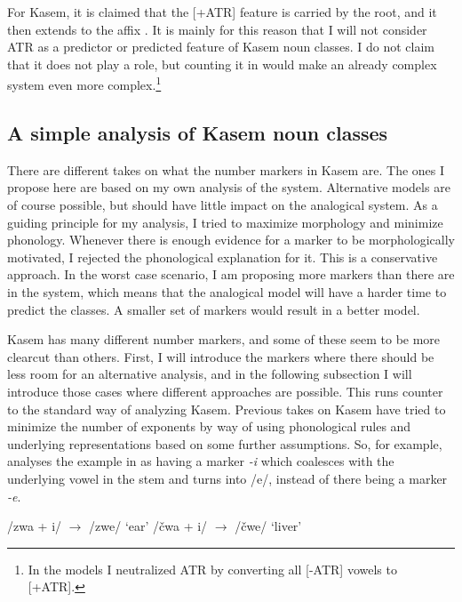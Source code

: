 For Kasem, it is claimed that the [+ATR] feature is carried by the root, and it then extends to the affix \autocite[501]{Casali.2008}. It is mainly for this reason that I will not consider ATR as a predictor or predicted feature of Kasem noun classes. I do not claim that it does not play a role, but counting it in would make an already complex system even more complex.\footnote{In the models I neutralized ATR by converting all [-ATR] vowels to [+ATR].}

\subsection{A simple analysis of Kasem noun classes}

There are different takes on what the number markers in Kasem are. The ones I propose here are based on my own analysis of the system. Alternative models are of course possible, but should have little impact on the analogical system. As a guiding principle for my analysis, I tried to maximize morphology and minimize phonology. Whenever there is enough evidence for a marker to be morphologically motivated, I rejected the phonological explanation for it. This is a conservative approach. In the worst case scenario, I am proposing more markers than there are in the system, which means that the analogical model will have a harder time to predict the classes. A smaller set of markers would result in a better model. %

Kasem has many different number markers, and some of these seem to be more clearcut than others. First, I will introduce the markers where there should be less room for an alternative analysis, and in the following subsection I will introduce those cases where different approaches are possible. This runs counter to the standard way of analyzing Kasem. Previous takes on Kasem have tried to minimize the number of exponents by way of using phonological rules and underlying representations based on some further assumptions. So, for example, \textcite[184]{deHaas.1987} analyses the example in  as having a marker \textit{-i} which coalesces with the underlying vowel in the stem and turns into /e/, instead of there being a marker \textit{-e}.

\begin{exe}
    \ex \label{kasem-wrong-1}
    \begin{xlist}
        \ex /zwa + i/ $\rightarrow$ /zwe/ `ear'
        \ex /čwa + i/ $\rightarrow$ /čwe/ `liver'
    \end{xlist}
\end{exe}

